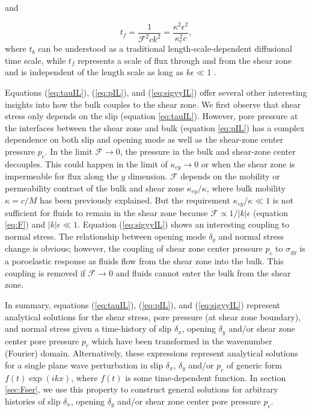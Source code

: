 \documentclass[draft]{agujournal2019}
\begin{document}
and
 
\begin{equation}
    t_{f} = \frac{1}{\mathcal{F}^2 c k^2} = \frac{\kappa^2 \epsilon^2}{\kappa_c^2 c },
    \label{eq:tf}
\end{equation}
where $t_b$ can be understood as a traditional length-scale-dependent diffusional time scale, while $t_f$ represents a scale of flux through and from the shear zone and is independent of the length scale as long as $k \epsilon \ll 1$ .

Equations (\ref{eq:tauIL}), (\ref{eq:pIL}), and (\ref{eq:sigyyIL}) offer several other interesting insights into how the bulk couples to the shear zone. We first observe that shear stress only depends on the slip (equation \ref{eq:tauIL}). However, pore pressure at the interfaces between the shear zone and bulk (equation \ref{eq:pIL}) has a complex dependence on both slip and opening mode as well as the shear-zone center pressure $p_c$. In the limit $\mathcal{F} \rightarrow 0$, the pressure in the bulk and shear-zone center decouples. This could happen in the limit of $\kappa_{cy} \rightarrow 0$ or when the shear zone is impermeable for flux along the $y$ dimension. $\mathcal{F}$ depends on the mobility or permeability contrast of the bulk and shear zone $\kappa_{cy}/\kappa$, where bulk mobility $\kappa = c/M$ has been previously explained. But the requirement $\kappa_{cy}/\kappa \ll 1$ is not sufficient for fluids to remain in the shear zone because $\mathcal{F} \propto 1/|k|\epsilon$ (equation \ref{eq:F}) and $|k|\epsilon \ll 1$.
Equation (\ref{eq:sigyyIL}) shows an interesting coupling to normal stress.  The relationship between opening mode $\delta_y$ and normal stress change is obvious;  however,  the coupling of shear zone center pressure $p_c$ to $\sigma_{yy}$ is a poroelastic response as fluids flow from the shear zone into the bulk. This coupling is removed if $\mathcal{F} \rightarrow 0$ and fluids cannot enter the bulk from the shear zone.

In summary, equations (\ref{eq:tauIL}), (\ref{eq:pIL}), and (\ref{eq:sigyyIL}) represent analytical solutions for the shear stress, pore pressure (at shear zone boundary), and normal stress given a time-history of slip $\delta_x$, opening $\delta_y$ and/or shear zone center pore pressure $p_c$ which have been transformed in the wavenumber (Fourier) domain. Alternatively, these expressions represent analytical solutions for a single plane wave perturbation in slip $\delta_x$, $\delta_y$ and/or $p_c$ of generic form $f(t)\exp(ikx)$, where $f(t)$ is some time-dependent function. In section \ref{sec:Fser}, we use this property to construct general solutions for arbitrary histories of slip $\delta_x$, opening $\delta_y$ and/or shear zone center pore pressure $p_c$.
\end{document}
